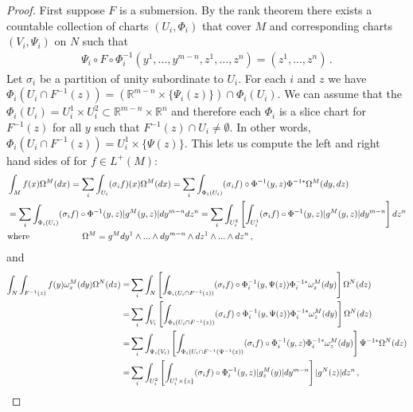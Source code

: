 \begin{proof}
First suppose $F$ is a submersion. By the rank theorem there exists a countable collection of charts $(U_i,\Phi_i)$ that cover $M$ and corresponding charts $(V_i,\Psi_i)$ on $N$ such that 
\begin{align}
\Psi_i\circ F\circ \Phi_i^{-1}(y^1,...,y^{m-n},z^1,...,z^n)=(z^1,...,z^n)\,.
\end{align}
Let $\sigma_i$ be a partition of unity subordinate to $U_i$. For each $i$ and $z$ we have $\Phi_i(U_i\cap F^{-1}(z))=\left(\mathbb{R}^{m-n}\times\{\Psi_i(z)\}\right)\cap \Phi_i(U_i)$. We can assume that the $\Phi_i(U_i)=U_i^1\times U_i^2\subset \mathbb{R}^{m-n}\times \mathbb{R}^n$ and therefore each $\Phi_i$ is a slice chart for $F^{-1}(z)$ for all $y$ such that $F^{-1}(z)\cap U_i\neq \emptyset$. In other words, $\Phi_i(U_i\cap F^{-1}(z))= U_i^1\times \{\Psi(z)\}$. This lets us compute the left and right hand sides of  for $f\in L^+(M)$:
\begin{align}
&\int_Mf(x) \Omega^M(dx)=\sum_i\int_{U_i}(\sigma_if)(x) \Omega^M(dx)
=\sum_i\int_{\Phi_i(U_i)}(\sigma_if)\circ \Phi^{-1}(y,z) \Phi^{-1*}\Omega^M(dy,dz)\notag\\
&=\sum_i\int_{\Phi_i(U_i)}(\sigma_if)\circ \Phi^{-1}(y,z)|g^M(y,z)| dy^{m-n}dz^n
=\sum_i\int_{U_i^2}\left[\int_{U_i^1}(\sigma_if)\circ \Phi^{-1}(y,z)|g^M(y,z)| dy^{m-n}\right]dz^n\\
&\text{where \hspace{2cm}}\Omega^M=g^M dy^1\wedge...\wedge dy^{m-n}\wedge dz^1\wedge...\wedge dz^n\,,\notag
\end{align}
and
\begin{align}
\int_{N}\int_{F^{-1}(z)} f(y)\omega^M_z(dy) \Omega^N(dz)=&\sum_i \int_{N}\left[\int_{\Phi_i(U_i\cap F^{-1}(z))} (\sigma_if)\circ\Phi_i^{-1}(y,\Psi(z))\Phi_i^{-1*}\omega^M_z(dy)\right] \Omega^N(dz)\notag\\
=&\sum_i \int_{V_i}\left[\int_{\Phi_i(U_i\cap F^{-1}(z))} (\sigma_if)\circ\Phi_i^{-1}(y,\Psi(z))\Phi_i^{-1*}\omega^M_z(dy)\right] \Omega^N(dz)\notag\\
=&\sum_i \int_{\Psi_i(V_i)}\left[\int_{\Phi_i(U_i\cap F^{-1}(\Psi^{-1}(z))} (\sigma_if)\circ\Phi_i^{-1}(y,z)\Phi_i^{-1*}\omega^M_z(dy)\right] \Psi^{-1*}\Omega^N(dz)\notag\\
=&\sum_i \int_{U_i^2}\left[\int_{U_i^1\times \{z\}} (\sigma_if)\circ\Phi_i^{-1}(y,z)|g^M_z(y)| dy^{m-n}\right] |g^N(z)| dz^n\,,\\

\end{align}
\end{proof}
